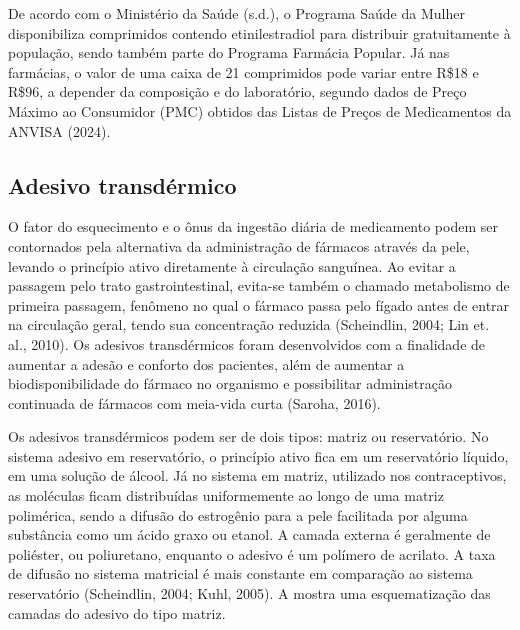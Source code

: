 De acordo com o Ministério da Saúde (s.d.), o Programa Saúde da Mulher disponibiliza comprimidos contendo etinilestradiol para distribuir gratuitamente à população, sendo também parte do Programa Farmácia Popular. Já nas farmácias, o valor de uma caixa de 21 comprimidos pode variar entre R\$18 e R\$96, a depender da composição e do laboratório, segundo dados de Preço Máximo ao Consumidor (PMC) obtidos das Listas de Preços de Medicamentos da ANVISA (2024).

\subsection{Adesivo transdérmico}

O fator do esquecimento e o ônus da ingestão diária de medicamento podem ser contornados pela alternativa da administração de fármacos através da pele, levando o princípio ativo diretamente à circulação sanguínea. Ao evitar a passagem pelo trato gastrointestinal, evita-se também o chamado metabolismo de primeira passagem, fenômeno no qual o fármaco passa pelo fígado antes de entrar na circulação geral, tendo sua concentração reduzida (Scheindlin, 2004; Lin et. al., 2010). Os adesivos transdérmicos foram desenvolvidos com a finalidade de aumentar a adesão e conforto dos pacientes, além de aumentar a biodisponibilidade do fármaco no organismo e possibilitar administração continuada de fármacos com meia-vida curta (Saroha, 2016).

Os adesivos transdérmicos podem ser de dois tipos: matriz ou reservatório. No sistema adesivo em reservatório, o princípio ativo fica em um reservatório líquido, em uma solução de álcool. Já no sistema em matriz, utilizado nos contraceptivos, as moléculas ficam distribuídas uniformemente ao longo de uma matriz polimérica, sendo a difusão do estrogênio para a pele facilitada por alguma substância como um ácido graxo ou etanol. A camada externa é geralmente de poliéster,  ou poliuretano, enquanto o adesivo é um polímero de acrilato. A taxa de difusão no sistema matricial é mais constante em comparação ao sistema reservatório (Scheindlin, 2004; Kuhl, 2005). A  mostra uma esquematização das camadas do adesivo do tipo matriz.

